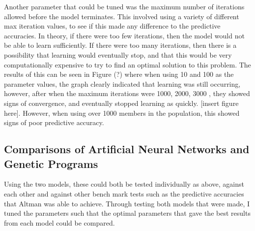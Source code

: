 \documentclass[11pt]{article}
\begin{document}
Another parameter that could be tuned was the maximum number of iterations allowed before the model terminates. This involved using a variety of different max iteration values, to see if this made any difference to the predictive accuracies. In theory, if there were too few iterations, then the model would not be able to learn sufficiently. If there were too many iterations, then there is a possibility that learning would eventually stop, and that this would be very computationally expensive to try to find an optimal solution to this problem. The results of this can be seen in Figure (?) where when using 10 and 100 as the parameter values, the graph clearly indicated that learning was still occurring, however, after when the maximum iterations were 1000, 2000, 3000 , they showed signs of convergence, and eventually stopped learning as quickly. [insert figure here]. However, when using over 1000 members in the population, this showed signs of poor predictive  accuracy.

\subsection{Comparisons of Artificial Neural Networks and Genetic Programs}
Using the two models, these could both be tested individually as above, against each other and against other bench mark tests such as the predictive accuracies that Altman was able to achieve. 
Through testing both models that were made, I tuned the parameters such that the optimal parameters that gave the best results from each model could be compared. 




\end{document}
